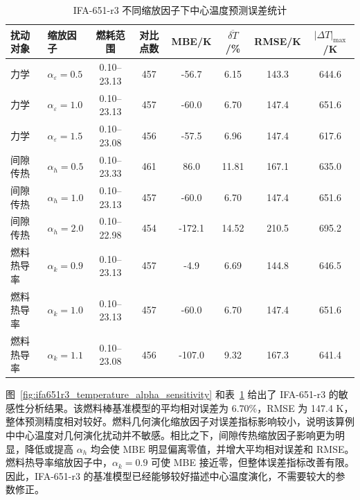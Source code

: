 \begin{table}[H]
	\centering
	\caption{IFA-651-r3 不同缩放因子下中心温度预测误差统计}
	\label{tab:ifa651r3_temperature_alpha_sensitivity_error}
	\small
	\begin{tabular}{llcccccc}
		\toprule
		扰动对象 & 缩放因子 & 燃耗范围 & 对比点数 & MBE/K & $\overline{\delta T}$/\% & RMSE/K & $|\Delta T|_{\max}$/K \\
		\midrule
		力学 & $\alpha_{\varepsilon}=0.5$ & 0.10--23.13 & 457 & -56.7 & 6.15 & 143.3 & 644.6 \\
		力学 & $\alpha_{\varepsilon}=1.0$ & 0.10--23.13 & 457 & -60.0 & 6.70 & 147.4 & 651.6 \\
		力学 & $\alpha_{\varepsilon}=1.5$ & 0.10--23.08 & 456 & -57.5 & 6.96 & 147.4 & 617.6 \\
		\midrule
		间隙传热 & $\alpha_h=0.5$ & 0.10--23.33 & 461 & 86.0 & 11.81 & 167.1 & 635.0 \\
		间隙传热 & $\alpha_h=1.0$ & 0.10--23.13 & 457 & -60.0 & 6.70 & 147.4 & 651.6 \\
		间隙传热 & $\alpha_h=2.0$ & 0.10--22.98 & 454 & -172.1 & 14.52 & 210.5 & 695.2 \\
		\midrule
		燃料热导率 & $\alpha_k=0.9$ & 0.10--23.13 & 457 & -4.9 & 6.69 & 144.8 & 646.5 \\
		燃料热导率 & $\alpha_k=1.0$ & 0.10--23.13 & 457 & -60.0 & 6.70 & 147.4 & 651.6 \\
		燃料热导率 & $\alpha_k=1.1$ & 0.10--23.08 & 456 & -107.0 & 9.32 & 167.3 & 641.4 \\
		\bottomrule
	\end{tabular}
\end{table}
图~\ref{fig:ifa651r3_temperature_alpha_sensitivity} 和表~\ref{tab:ifa651r3_temperature_alpha_sensitivity_error} 给出了 IFA-651-r3 的敏感性分析结果。该燃料棒基准模型的平均相对误差为 6.70\%，RMSE 为 147.4 K，整体预测精度相对较好。燃料几何演化缩放因子对误差指标影响较小，说明该算例中中心温度对几何演化扰动并不敏感。相比之下，间隙传热缩放因子影响更为明显，降低或提高 \(\alpha_h\) 均会使 MBE 明显偏离零值，并增大平均相对误差和 RMSE。燃料热导率缩放因子中，\(\alpha_k=0.9\) 可使 MBE 接近零，但整体误差指标改善有限。因此，IFA-651-r3 的基准模型已经能够较好描述中心温度演化，不需要较大的参数修正。

